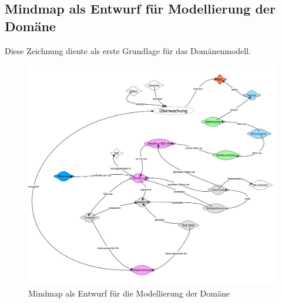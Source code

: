 \begin{landscape}
\section{Mindmap als Entwurf für Modellierung der Domäne}
Diese Zeichnung diente als erste Grundlage für das Domänenmodell.
\begin{figure}[H]
	\center
	\includegraphics[scale=.08]{Grafiken/mmDomain.jpg}
	\caption{Mindmap als Entwurf für die Modellierung der Domäne }
	\label{fig: Mindmap als Entwurf die für Modellierung der Domäne}
\end{figure}
	
\end{landscape}